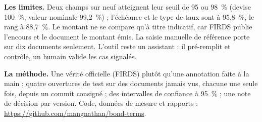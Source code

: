 \documentclass[11pt,a4paper]{article}
\begin{document}
\textbf{Les limites.} Deux champs sur neuf atteignent leur seuil de 95 ou 98~\% (devise 100~\%, valeur nominale 99,2~\%) ; l'échéance et le type de taux sont à 95,8~\%, le rang à 88,7~\%. Le montant ne se compare qu'à titre indicatif, car FIRDS publie l'encours et le document le montant émis. La saisie manuelle de référence porte sur dix documents seulement. L'outil reste un assistant : il pré-remplit et contrôle, un humain valide les cas signalés.

\textbf{La méthode.} Une vérité officielle (FIRDS) plutôt qu'une annotation faite à la main ; quatre ouvertures de test sur des documents jamais vus, chacune une seule fois, depuis un commit consigné ; des intervalles de confiance à 95~\% ; une note de décision par version. Code, données de mesure et rapports : \url{https://github.com/mangnathan/bond-terms}.
\end{document}
